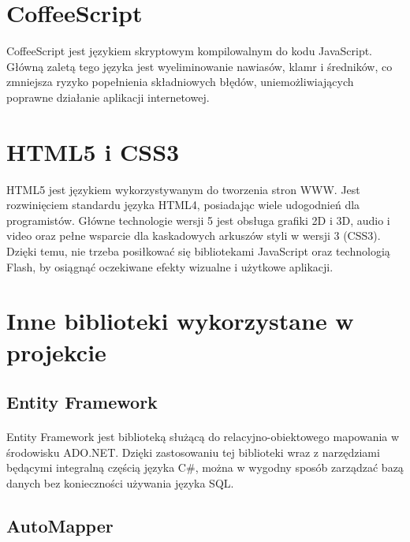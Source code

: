\section{CoffeeScript} %
\label{sec:coffeescript}

CoffeeScript jest językiem skryptowym kompilowalnym do kodu JavaScript. Główną zaletą tego języka jest wyeliminowanie nawiasów, klamr i średników, co zmniejsza ryzyko popełnienia składniowych błędów, uniemożliwiających poprawne działanie aplikacji internetowej.

\section{HTML5 i CSS3} %
\label{par:html5_i_css3}

HTML5 jest językiem wykorzystywanym do tworzenia stron WWW. Jest rozwinięciem standardu języka HTML4, posiadając wiele udogodnień dla programistów. Główne technologie wersji 5 jest obsługa grafiki 2D i 3D, audio i video oraz pełne wsparcie dla kaskadowych arkuszów styli w wersji 3 (CSS3). Dzięki temu, nie trzeba posiłkować się bibliotekami JavaScript oraz technologią Flash, by osiągnąć oczekiwane efekty wizualne i użytkowe aplikacji.


\section{Inne biblioteki wykorzystane w projekcie} %
\label{sec:inne_biblioteki_wykorzystane_w_projekcie}

\subsection{Entity Framework} 
\label{sub:EntityFramework}
\paragraph{}
Entity Framework jest biblioteką służącą do relacyjno-obiektowego mapowania w środowisku ADO.NET. Dzięki zastosowaniu tej biblioteki wraz z narzędziami będącymi integralną częścią języka C\#, można w wygodny sposób zarządzać bazą danych bez konieczności używania języka SQL.

\subsection{AutoMapper} %
\label{sub:automapper}
\paragraph{} %
\label{par:}

